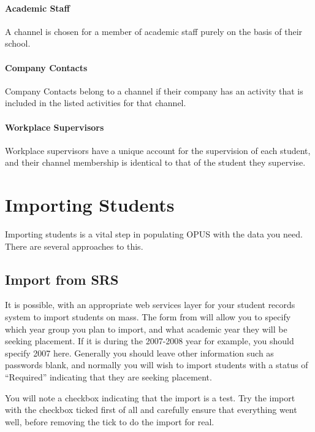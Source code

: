 \documentclass[12 pt]{book}
\begin{document}
\subsubsection{Academic Staff}

A channel is chosen for a member of academic staff purely on the basis of their
school.

\subsubsection{Company Contacts}

Company Contacts belong to a channel if their company has an activity that is
included in the listed activities for that channel.

\subsubsection{Workplace Supervisors}

Workplace supervisors have a unique account for the supervision of each student,
and their channel membership is identical to that of the student they
supervise.


\chapter{Importing Students}

Importing students is a vital step in populating OPUS with the data you need. There are several
approaches to this.

\section{Import from SRS}

It is possible, with an appropriate web services layer for your student records system to import
students on mass. The form from  will allow
you to specify which year group you plan to import, and what academic year they will be seeking
placement. If it is during the 2007-2008 year for example, you should specify 2007 here. Generally
you should leave other information such as passwords blank, and normally you will wish to
import students with a status of ``Required'' indicating that they are seeking placement.

You will note a checkbox indicating that the import is a test. Try the import with the checkbox
ticked first of all and carefully ensure that everything went well, before removing the tick
to do the import for real.
\end{document}
